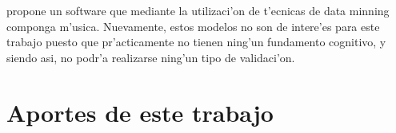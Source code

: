 \cite{Shih-Chuan} propone un software que mediante la utilizaci'on de t'ecnicas de data minning componga m'usica. Nuevamente, estos modelos
no son de intere'es para este trabajo puesto que pr'acticamente no tienen ning'un fundamento cognitivo, y siendo asi, no podr'a realizarse 
ning'un tipo de validaci'on.
%
%

\section{Aportes de este trabajo}
